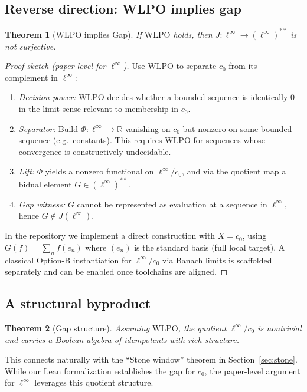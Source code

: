 \documentclass[11pt]{article}  %
\newtheorem{theorem}{Theorem}[section]
\newenvironment{thm}{\begin{theorem}}{\end{theorem}}
\newtheorem{theorem}{Theorem}[section]
\newenvironment{thm}{\begin{theorem}}{\end{theorem}}
\newcommand{\R}{\mathbb{R}}
\newcommand{\linf}{\ell^\infty}
\newcommand{\cnull}{c_0}
\newcommand{\WLPO}{\mathrm{WLPO}}
\begin{document}
\subsection{Reverse direction: WLPO implies gap}\label{sec:wlpo-implies-gap}

\begin{thm}[$\WLPO$ implies Gap]
If $\WLPO$ holds, then $J:\linf\to(\linf)^{**}$ is not surjective.
\end{thm}

\begin{proof}[Proof sketch (paper-level for $\ell^\infty$)]
Use $\WLPO$ to separate $\cnull$ from its complement in $\linf$:
\begin{enumerate}[label=\arabic*.]
\item \emph{Decision power:} $\WLPO$ decides whether a bounded sequence is identically $0$ in the limit sense relevant to membership in $\cnull$.
\item \emph{Separator:} Build $\Phi:\linf\to\R$ vanishing on $\cnull$ but nonzero on some bounded sequence (e.g.\ constants). This requires $\WLPO$ for sequences whose convergence is constructively undecidable.
\item \emph{Lift:} $\Phi$ yields a nonzero functional on $\linf/\cnull$, and via the quotient map a bidual element $G\in(\linf)^{**}$.
\item \emph{Gap witness:} $G$ cannot be represented as evaluation at a sequence in $\linf$, hence $G\notin J(\linf)$.
\end{enumerate}
In the repository we implement a direct construction with $X=c_0$, using $G(f)=\sum_n f(e_n)$ where $(e_n)$ is the standard basis (full local target).  A classical Option-B instantiation for $\ell^\infty/c_0$ via Banach limits is scaffolded separately and can be enabled once toolchains are aligned.
\end{proof}

\subsection{A structural byproduct}

\begin{thm}[Gap structure]
Assuming $\WLPO$, the quotient $\linf/\cnull$ is nontrivial and carries a Boolean algebra of idempotents with rich structure.
\end{thm}

This connects naturally with the ``Stone window'' theorem in Section~\ref{sec:stone}. While our Lean formalization establishes the gap for $c_0$, the paper-level argument for $\ell^\infty$ leverages this quotient structure.
\end{document}
